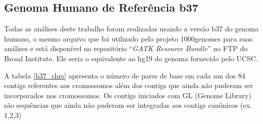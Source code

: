 \subsection{Genoma Humano de Referência b37}

Todas as análises deste trabalho foram realizadas usando a versão b37 do genoma humano, o mesmo arquivo que foi utilizado pelo projeto 1000genomes para suas análises e está disponível no repositório ``\textit{GATK Resource Bundle}'' no FTP do Broad Institute. Ele seria o equivalente ao hg19 do genoma fornecido pelo UCSC.

A tabela \ref{b37_chrs} apresenta o número de pares de base em cada um dos 84 contigs referentes aos cromossomos além dos contigs que ainda não puderam ser incorporados nos cromossomos. Os contigs iniciados com GL (Genome Library) são sequências que ainda não puderam ser integradas aos contigs canônicos (ex. 1,2,3)
 
